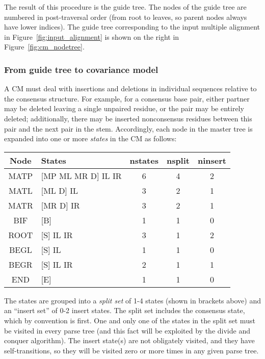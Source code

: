 \documentclass[11pt]{article}
\begin{document}
The result of this procedure is the guide tree. The nodes of the guide
tree are numbered in post-traversal order (from root to leaves, so
parent nodes always have lower indices). The guide tree corresponding
to the input multiple alignment in Figure~\ref{fig:input_alignment} is
shown on the right in Figure~\ref{fig:cm_nodetree}.

\subsubsection{From guide tree to covariance model}

A CM must deal with insertions and deletions in individual sequences
relative to the consensus structure. For example, for a consensus base
pair, either partner may be deleted leaving a single unpaired residue,
or the pair may be entirely deleted; additionally, there may be
inserted nonconsensus residues between this pair and the next pair in
the stem. Accordingly, each node in the master tree is expanded into
one or more \emph{states} in the CM as follows:

\vspace{0.5em}
\begin{tabular}{clccc}
Node   &  States             & nstates & nsplit & ninsert \\ \hline
MATP   & [MP ML MR D] IL IR  &   6     &   4    &  2   \\
MATL   & [ML D] IL           &   3     &   2    &  1   \\
MATR   & [MR D] IR           &   3     &   2    &  1   \\
BIF    & [B]                 &   1     &   1    &  0   \\
ROOT   & [S] IL IR           &   3     &   1    &  2   \\
BEGL   & [S] IL              &   1     &   1    &  0   \\
BEGR   & [S] IL IR           &   2     &   1    &  1   \\
END    & [E]                 &   1     &   1    &  0   \\ \hline
\end{tabular}
\vspace{0.5em}

The states are grouped into a \emph{split set} of 1-4 states (shown in
brackets above) and an ``insert set'' of 0-2 insert states. The split
set includes the consensus state, which by convention is first. One
and only one of the states in the split set must be visited in every
parse tree (and this fact will be exploited by the divide and conquer
algorithm). The insert state(s) are not obligately visited, and they
have self-transitions, so they will be visited zero or more times in
any given parse tree.
\end{document}
